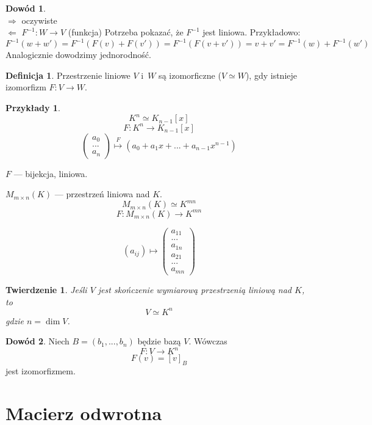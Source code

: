 \documentclass[12pt,a4paper]{article}
\theoremstyle{plain}
\newtheorem{tw}{Twierdzenie}[section]
\theoremstyle{definition}
\theoremstyle{definition}
\newtheorem{df}{Definicja}[section]
\theoremstyle{definition}
\theoremstyle{definition}
\newtheorem*{dd}{Dowód}
\theoremstyle{definition}
\theoremstyle{definition}
\theoremstyle{definition}
\newtheorem*{przy}{Przykłady}
\theoremstyle{definition}
\theoremstyle{definition}
\begin{document}
\begin{dd} ~\\
    $\Rightarrow$ oczywiste\\
  $\Leftarrow$ $F^{-1}: W \rightarrow V$ (funkcja)
  Potrzeba pokazać, że $F^{-1}$ jest liniowa. Przykładowo:
  $$F^{-1}(w+w')=F^{-1}(F(v)+F(v'))=F^{-1}(F(v+v'))=v+v'=F^{-1}(w)+F^{-1}(w')$$ 
  Analogicznie dowodzimy jednorodność.
\end{dd}

\begin{df}
    Przestrzenie liniowe $V$ i~$W$ są izomorficzne ($V \simeq W$), gdy istnieje
    izomorfizm $F: V \rightarrow W$.
\end{df}

\begin{przy}
    \[K^n \simeq K_{n-1}[x]\]
    \[F: K^n \rightarrow K_{n-1}[x]\]
    \[\begin{pmatrix}a_0\\...\\a_n\end{pmatrix} \overset{F}{\longmapsto}
    \left(a_0+a_1x+...+a_{n-1}x^{n-1}\right)\]
    
    $F$ --- bijekcja, liniowa.
    
    \vspace{5mm}
    $M_{m\times n}(K)$ --- przestrzeń liniowa nad $K$.
  \[M_{m\times n}(K) \simeq K^{mn}\]
  \[F: M_{m\times n}(K) \rightarrow K^{mn}\]

  \[(a_{ij}) \longmapsto \begin{pmatrix}a_{11}\\...\\a_{1n}\\
    a_{21}\\...\\a_{mn}\end{pmatrix}\]
\end{przy}

\begin{tw}
    Jeśli $V$ jest skończenie wymiarową przestrzenią liniową nad $K$, to
  \[V \simeq K^n\]
  gdzie $n=\dim V$.
\end{tw}

\begin{dd}
    Niech $B=(b_1, ..., b_n)$ będzie bazą $V$. Wówczas
  \[F: V \rightarrow K^n\]
  \[F(v) = [v]_B\]
  jest izomorfizmem.
\end{dd}

\section{Macierz odwrotna}
\end{document}
